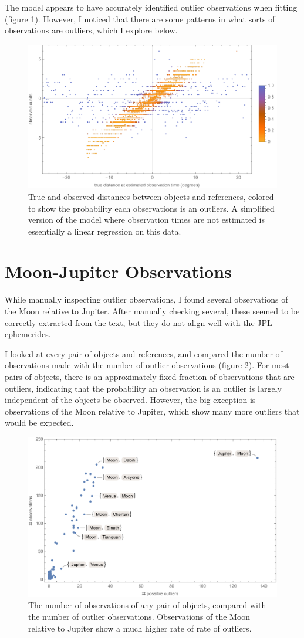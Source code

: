 \documentclass{article}
\begin{document}
The model appears to have accurately identified outlier observations when fitting (figure \ref{fig:outliers}). However, I noticed that there are some patterns in what sorts of observations are outliers, which I explore below.

\begin{figure}[h]
    \centering
    \includegraphics[width=0.7\linewidth]{outliers.pdf}
    \caption{True and observed distances between objects and references, colored to show the probability each observations is an outliers. A simplified version of the model where observation times are not estimated is essentially a linear regression on this data.}
    \label{fig:outliers}
\end{figure}

\section{Moon-Jupiter Observations}
While manually inspecting outlier observations, I found several observations of the Moon relative to Jupiter. After manually checking several, these seemed to be correctly extracted from the text, but they do not align well with the JPL ephemerides.

I looked at every pair of objects and references, and compared the number of observations made with the number of outlier observations (figure \ref{fig:outlierPairs}). For most pairs of objects, there is an approximately fixed fraction of observations that are outliers, indicating that the probability an observation is an outlier is largely independent of the objects be observed. However, the big exception is observations of the Moon relative to Jupiter, which show many more outliers that would be expected.

\begin{figure}[h]
    \centering
    \includegraphics[width=0.6\linewidth]{outlierPairs.pdf}
    \caption{The number of observations of any pair of objects, compared with the number of outlier observations. Observations of the Moon relative to Jupiter show a much higher rate of rate of outliers.}
    \label{fig:outlierPairs}
\end{figure}
\end{document}
